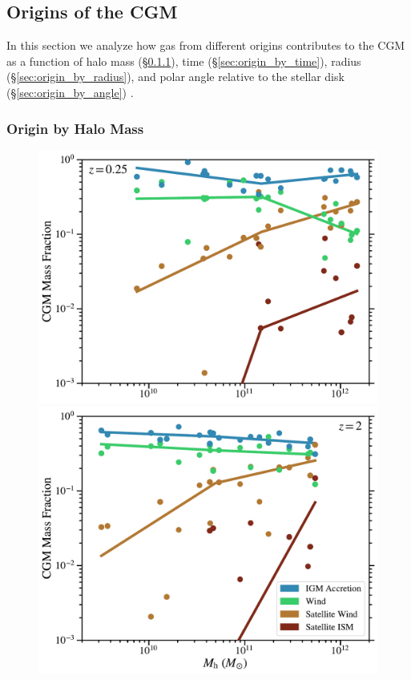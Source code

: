 \documentclass[fleqn,usenatbib]{mnras}
\begin{document}
\subsection{Origins of the CGM}
\label{sec:origin_by_mass}

In this section we analyze how gas from different origins contributes to the CGM as a function of halo mass (\S\ref{sec:origin_by_halo_mass}), time (\S\ref{sec:origin_by_time}), radius (\S\ref{sec:origin_by_radius}), and polar angle relative to the stellar disk (\S\ref{sec:origin_by_angle}) .

\subsubsection{Origin by Halo Mass}
\label{sec:origin_by_halo_mass}
\begin{figure}
\includegraphics[width=\columnwidth]{figures/CGM_mass_frac_vs_Mh_CGM_snum465.pdf}
\includegraphics[width=\columnwidth]{figures/CGM_mass_frac_vs_Mh_CGM_snum172.pdf}

\end{figure}
\end{document}
